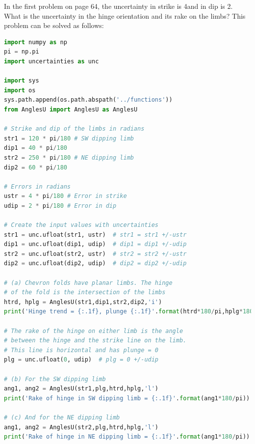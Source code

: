 \documentclass[a4paper , 12pt]{book}
\begin{document}
In the first problem on page 64, the uncertainty in strike is 4\degree and in dip is 2\degree. What is the uncertainty in the hinge orientation and its rake on the limbs? This problem can be solved as follows:

\begin{center}
\begin{lstlisting}[language=Python, frame=single]
import numpy as np
pi = np.pi
import uncertainties as unc

import sys
import os
sys.path.append(os.path.abspath('../functions'))
from AnglesU import AnglesU as AnglesU

# Strike and dip of the limbs in radians
str1 = 120 * pi/180 # SW dipping limb
dip1 = 40 * pi/180
str2 = 250 * pi/180 # NE dipping limb
dip2 = 60 * pi/180

# Errors in radians
ustr = 4 * pi/180 # Error in strike
udip = 2 * pi/180 # Error in dip

# Create the input values with uncertainties
str1 = unc.ufloat(str1, ustr)  # str1 = str1 +/-ustr
dip1 = unc.ufloat(dip1, udip)  # dip1 = dip1 +/-udip
str2 = unc.ufloat(str2, ustr)  # str2 = str2 +/-ustr
dip2 = unc.ufloat(dip2, udip)  # dip2 = dip2 +/-udip

# (a) Chevron folds have planar limbs. The hinge
# of the fold is the intersection of the limbs
htrd, hplg = AnglesU(str1,dip1,str2,dip2,'i')
print('Hinge trend = {:.1f}, plunge {:.1f}'.format(htrd*180/pi,hplg*180/pi))

# The rake of the hinge on either limb is the angle 
# between the hinge and the strike line on the limb. 
# This line is horizontal and has plunge = 0
plg = unc.ufloat(0, udip)  # plg = 0 +/-udip

# (b) For the SW dipping limb
ang1, ang2 = AnglesU(str1,plg,htrd,hplg,'l')
print('Rake of hinge in SW dipping limb = {:.1f}'.format(ang1*180/pi))

# (c) And for the NE dipping limb
ang1, ang2 = AnglesU(str2,plg,htrd,hplg,'l')
print('Rake of hinge in NE dipping limb = {:.1f}'.format(ang1*180/pi))
\end{lstlisting}
\end{center}
\end{document}
